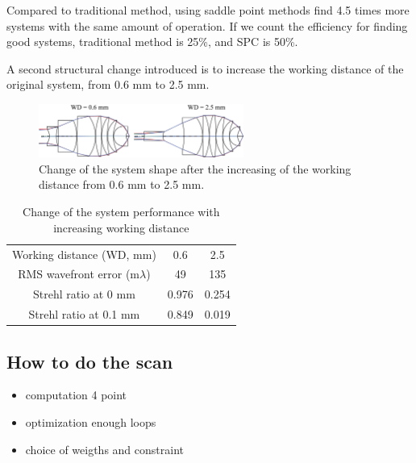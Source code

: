 Compared to traditional method, using saddle point methods find 4.5 times more systems with the same amount of operation. If we count the efficiency for finding good systems, traditional method is 25\%, and SPC is 50\%.

A second structural change introduced is to increase the working distance of the original system, from 0.6 mm to 2.5 mm. 

\begin{figure}[h!]
    \centering
    \includegraphics[width=0.6\textwidth]{chapter-4/figures/Vollrath_WD06TO25.png}
    \caption{Change of the system shape after the increasing of the working distance from 0.6 mm to 2.5 mm.}
    \label{fig: vollrathWD06to25}
\end{figure}

\setlength{\arrayrulewidth}{.5mm}
\setlength{\tabcolsep}{18pt}
\renewcommand{\arraystretch}{1.2}
\begin{table}[h!]
    \centering
    \captionsetup{justification=centering}
    \caption{Change of the system performance with increasing working distance}
    \label{table: WDchange}
    \vspace{-1em}
    \begin{tabular}{ c c c }
    \hline 
     Working distance (WD, mm) & 0.6 & 2.5\\ 
     \cmidrule{2-3}
    RMS wavefront error (m$\lambda$) & 49 & 135  \\ 
    Strehl ratio at 0 mm & 0.976 & 0.254\\
    Strehl ratio at 0.1 mm & 0.849 & 0.019\\
    \hline
    \end{tabular}
\end{table}








\subsection{How to do the scan}
\begin{itemize}
\item computation 4 point
\item optimization enough loops
\item choice of weigths and constraint
\end{itemize}


